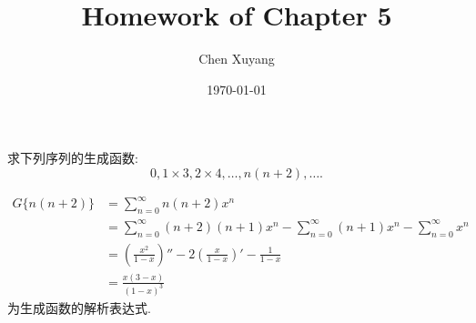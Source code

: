\documentclass[chinese]{assignment}[2019/10/15]
\title{Homework of Chapter 5}
\author{Chen Xuyang}
\date{\today}
\institute{School of Mathematical Science}
\newcommand{\lr}[3]{\left#1#3\right#2}
\begin{document}
    \maketitle
    \begin{problem}
        求下列序列的生成函数:
        \begin{equation}
            0, 1\times 3, 2\times 4, \dotsc, n(n+2), \dotsc.
        \end{equation}
    \end{problem}
    \begin{solution}
        \begin{equation}
            \begin{aligned}
                G\{n(n+2)\}
                &=\sum_{n=0}^\infty n(n+2)x^n\\
                &= \sum_{n=0}^\infty (n+2)(n+1)x^n - \sum_{n=0}^{\infty}(n+1)x^n - \sum_{n=0}^{\infty}x^n\\
                &= \lr(){\frac{x^2}{1-x}}'' - 2\lr(){\frac{x}{1-x}}' - \frac{1}{1-x}\\
                &= \frac{x(3-x)}{(1-x)^3}
            \end{aligned}
        \end{equation}
        为生成函数的解析表达式.
    \end{solution}
\end{document}

